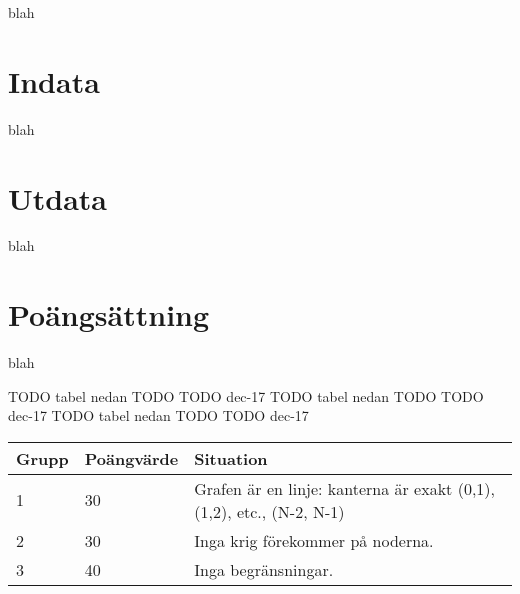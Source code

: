 
blah

\section*{Indata}

blah

\section*{Utdata}

blah

\section*{Poängsättning}

blah

TODO tabel nedan TODO TODO dec-17
TODO tabel nedan TODO TODO dec-17
TODO tabel nedan TODO TODO dec-17
\begin{tabular}{| l | l | l |}
\hline
Grupp & Poängvärde & Situation \\ \hline
1     & 30         & Grafen är en linje: kanterna är exakt (0,1), (1,2), etc., (N-2, N-1) \\ \hline
2     & 30         & Inga krig förekommer på noderna. \\ \hline
3     & 40         & Inga begränsningar. \\ \hline
\end{tabular}
